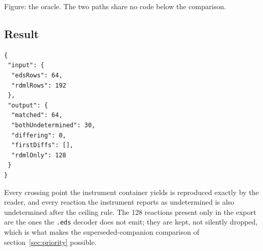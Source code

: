 \begin{center}\end{center}
\begin{center}\small Figure: the oracle. The two paths share no code below the comparison.\normalsize\end{center}

\subsection*{Result}
\begin{lstlisting}[style=jstiny]
{
 "input": {
  "edsRows": 64,
  "rdmlRows": 192
 },
 "output": {
  "matched": 64,
  "bothUndetermined": 30,
  "differing": 0,
  "firstDiffs": [],
  "rdmlOnly": 128
 }
}
\end{lstlisting}


Every crossing point the instrument container yields is reproduced exactly by the reader, and every
reaction the instrument reports as undetermined is also undetermined after the ceiling rule. The 128
reactions present only in the export are the ones the \texttt{.eds} decoder does not emit; they are
kept, not silently dropped, which is what makes the superseded-companion comparison of
section~\ref{sec:priority} possible. \PASS


